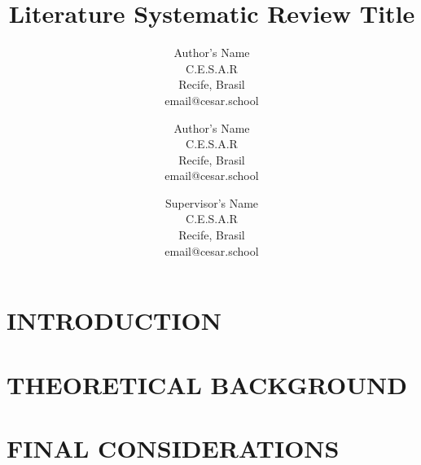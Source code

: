 \documentclass[10pt, twocolumn]{article}
\title{\textbf{Literature Systematic Review  Title}}
\author{
    \fontsize{11}{13}\selectfont 
    1\ts{st} Author's Name \\
    \fontsize{10}{11}\selectfont 
    C.E.S.A.R\\
    \fontsize{10}{11}\selectfont 
    Recife, Brasil\\
    \fontsize{10}{11}\selectfont
    email@cesar.school\\
    \and
    \fontsize{11}{13}\selectfont 
    2\ts{nd} Author's Name\\
    \fontsize{10}{11}
    \selectfont C.E.S.A.R\\
    \fontsize{10}{11}\selectfont 
    Recife, Brasil\\
    \fontsize{10}{11}\selectfont
    email@cesar.school\\
     \and
    \fontsize{11}{13}\selectfont 
    Supervisor's Name\\
    \fontsize{10}{11}
    \selectfont C.E.S.A.R\\
    \fontsize{10}{11}\selectfont 
    Recife, Brasil\\
    \fontsize{10}{11}\selectfont
    email@cesar.school\\
}
\date{}
\begin{document}
\renewcommand{\abstractname}{} %


\maketitle %



\setlength{\absleftindent}{0em}
\setlength{\absrightindent}{0em}

\begin{abstract}
    \abstractText %
\end{abstract}

\section{INTRODUCTION}


\section{THEORETICAL BACKGROUND}


\section{FINAL CONSIDERATIONS}




\end{document}
